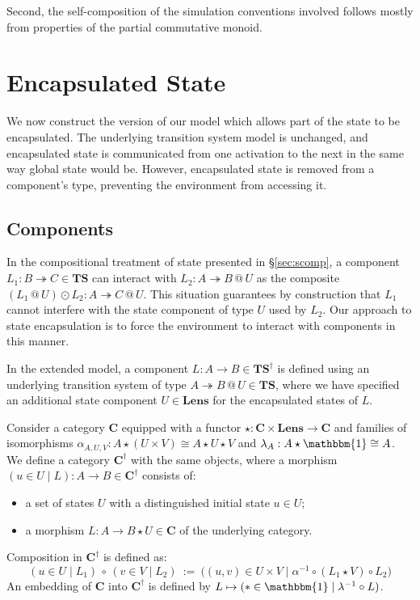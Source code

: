 \documentclass[acmsmall,screen,review,anonymous]{acmart}
\begin{document}
Second,
the self-composition of the simulation conventions involved
follows mostly from properties of the partial commutative monoid.


\section{Encapsulated State} \label{sec:encap} %

We now construct the version of our model
which allows part of the state to be encapsulated.
The underlying transition system model is unchanged,
and encapsulated state
is communicated from one activation to the next
in the same way global state would be.
However,
encapsulated state
is removed from a component's type,
preventing the environment from accessing it.

\subsection{Components} %

In the compositional treatment of state
presented in \S\ref{sec:scomp},
a component $L_1 : B \twoheadrightarrow C \in \mathbf{TS}$
can interact with %
$L_2 : A \twoheadrightarrow B \mathbin@ U$
as the composite $(L_1 \mathbin@ U) \odot L_2 : A \twoheadrightarrow C \mathbin@ U$.
This situation guarantees by construction that
$L_1$ cannot interfere with the state component of type $U$
used by $L_2$.
Our approach to state encapsulation
is to force the environment to
interact with components in this manner.

In the extended model,
a component $L : A \rightarrow B \in \mathbf{TS}^\dagger$
is defined using an underlying transition system
of type $A \twoheadrightarrow B \mathbin@ U \in \mathbf{TS}$,
where we have specified an
additional state component $U \in \mathbf{Lens}$
for the encapsulated states of $L$.

\begin{definition} \label{def:slts}
Consider a category $\mathbf{C}$
equipped with a functor
${\star} : \mathbf{C} \times \mathbf{Lens} \rightarrow \mathbf{C}$ and
families of isomorphisms
$
  \alpha_{A,U,V} : A \star (U \times V) \cong A \star U \star V
$ and $
  \lambda_A : A \star \mathbbm{1} \cong A
$.
We define a category $\mathbf{C}^\dagger$
with the same objects,
where a morphism
$(u \in U \mid L) : A \rightarrow B \in \mathbf{C}^\dagger$
consists of:
\begin{itemize}
  \item a set of states $U$ with a distinguished initial state $u \in U$;
  \item a morphism $L : A \rightarrow B \star U \in \mathbf{C}$
    of the underlying category.
\end{itemize}
Composition in $\mathbf{C}^\dagger$ is defined as:
\[
  (u \in U \mid L_1) \,\circ\, (v \in V \mid L_2) \::=\:
  \big( (u, v) \in U \times V \mid
        \alpha^{-1} \circ (L_1 \star V) \circ L_2 \big)
\]
An embedding of $\mathbf{C}$ into $\mathbf{C}^\dagger$
is defined by $L \mapsto (* \in \mathbbm{1} \mid \lambda^{-1} \circ L)$.
\end{definition}
\end{document}
